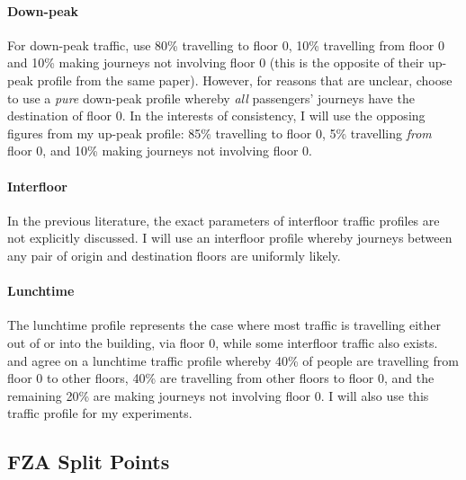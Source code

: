 \documentclass{UoYCSproject}
\begin{document}
\paragraph{Down-peak}

For down-peak traffic, \citet{Brand2004} use 80\% travelling to floor 0, 10\% travelling from floor 0 and 10\% making journeys not involving floor 0 (this is the opposite of their up-peak profile from the same paper).  However, for reasons that are unclear, \citet{Rong2003} choose to use a \textit{pure} down-peak profile whereby \textit{all} passengers' journeys have the destination of floor 0.  In the interests of consistency, I will use the opposing figures from my up-peak profile: 85\% travelling to floor 0, 5\% travelling \textit{from} floor 0, and 10\% making journeys not involving floor 0.

\paragraph{Interfloor}

In the previous literature, the exact parameters of interfloor traffic profiles are not explicitly discussed.  I will use an interfloor profile whereby journeys between any pair of origin and destination floors are uniformly likely.

\paragraph{Lunchtime}

The lunchtime profile represents the case where most traffic is travelling either out of or into the building, via floor 0, while some interfloor traffic also exists.  \citet{Rong2003} and \citet{Siikonen1993} agree on a lunchtime traffic profile whereby 40\% of people are travelling from floor 0 to other floors, 40\% are travelling from other floors to floor 0, and the remaining 20\% are making journeys not involving floor 0.  I will also use this traffic profile for my experiments.

\subsection{FZA Split Points}
\end{document}
